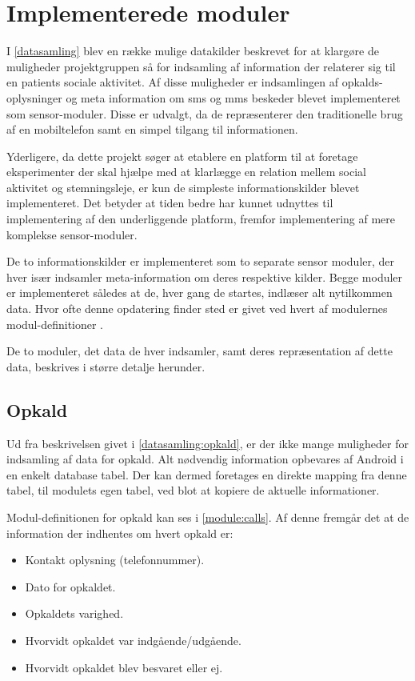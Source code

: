 \chapter{Implementerede moduler}
I \cref{datasamling} blev en række mulige datakilder beskrevet for at klargøre de muligheder projektgruppen så for indsamling af information der relaterer sig til en patients sociale aktivitet.
Af disse muligheder er indsamlingen af opkalds-oplysninger og meta information om sms og mms beskeder blevet implementeret som sensor-moduler.
Disse er udvalgt, da de repræsenterer den traditionelle brug af en mobiltelefon samt en simpel tilgang til informationen.

Yderligere, da dette projekt søger at etablere en platform til at foretage eksperimenter der skal hjælpe med at klarlægge en relation mellem social aktivitet og stemningsleje, er kun de simpleste informationskilder blevet implementeret.
Det betyder at tiden bedre har kunnet udnyttes til implementering af den underliggende platform, fremfor implementering af mere komplekse sensor-moduler.

De to informationskilder er implementeret som to separate sensor moduler, der hver især indsamler meta-information om deres respektive kilder.
Begge moduler er implementeret således at de, hver gang de startes, indlæser alt nytilkommen data.
Hvor ofte denne opdatering finder sted er givet ved hvert af modulernes modul-definitioner .

De to moduler, det data de hver indsamler, samt deres repræsentation af dette data, beskrives i større detalje herunder.

\section{Opkald}
Ud fra beskrivelsen givet i \cref{datasamling:opkald}, er der ikke mange muligheder for indsamling af data for opkald.
Alt nødvendig information opbevares af Android i en enkelt database tabel.
Der kan dermed foretages en direkte mapping fra denne tabel, til modulets egen tabel, ved blot at kopiere de aktuelle informationer.

Modul-definitionen for opkald kan ses i \cref{module:calls}.
Af denne fremgår det at de information der indhentes om hvert opkald er:
\begin{itemize}
\item Kontakt oplysning (telefonnummer).
\item Dato for opkaldet.
\item Opkaldets varighed.
\item Hvorvidt opkaldet var indgående/udgående.
\item Hvorvidt opkaldet blev besvaret eller ej.
\end{itemize}

